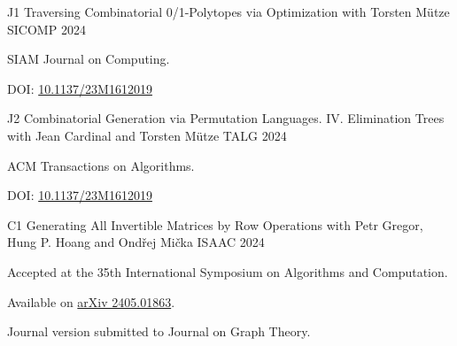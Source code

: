 



\vspace{2 mm}
\vspace{2 mm}

\begin{cvpublications}

  \cvpublication
  {J1}
  {Traversing Combinatorial 0/1-Polytopes via Optimization} %
  {with Torsten Mütze} %
  {SICOMP} %
  {2024}
  {
  \begin{cvitems} %
    \item SIAM Journal on Computing.
    \item[] DOI: \href{https://doi.org/10.1137/23M1612019}{10.1137/23M1612019}
  \end{cvitems}
  }

  \vspace{2 mm}

  \cvpublication
  {J2}
  {Combinatorial Generation via Permutation Languages. IV.  Elimination Trees} %
  {with Jean Cardinal and Torsten Mütze} %
  {TALG} %
  {2024}
  {
  \begin{cvitems} %
    \item ACM Transactions on Algorithms.
    \item[] DOI: \href{https://doi.org/10.1137/23M1612019}{10.1137/23M1612019}
  \end{cvitems}
  }
\end{cvpublications}

  
\vspace{10mm}
\vspace{2mm}

\begin{cvpublications}
  \cvpublication
  {C1} %
  {Generating All Invertible Matrices by Row Operations} %
  {with Petr Gregor, Hung P. Hoang and Ondřej Mička} %
  {ISAAC} %
  {2024}
  {
  \begin{cvitems} %
    \item Accepted at the 35th International Symposium on Algorithms and Computation.
    \item[] Available on \href{https://arxiv.org/abs/2405.01863}{arXiv 2405.01863}.
    \item Journal version submitted to Journal on Graph Theory.
  \end{cvitems}
  }
\end{cvpublications}
  
